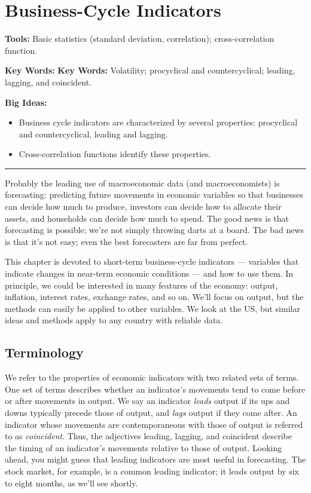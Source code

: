 \chapter{Business-Cycle Indicators}
\label{chp:bcin}
\hypertarget{indicators}{}

\textbf{Tools:} Basic statistics (standard deviation, correlation); cross-correlation function.

\textbf{Key Words:} \textbf{Key Words:} Volatility; procyclical and countercyclical;  leading, lagging, and coincident. 

\textbf{Big Ideas:}
\vspace{-0.1in}
\begin{itemize}
\item Business cycle indicators are characterized by several properties:  procyclical and countercyclical,
leading and lagging.
\item Cross-correlation functions identify these properties.
\end{itemize}
\rule{\textwidth}{1pt}

Probably the leading use of macroeconomic data (and macroeconomists)
is forecasting:  predicting future movements in economic variables
so that businesses can decide how much to produce,
investors can decide how to allocate their assets,
and households can decide how much to spend.
The good news is that forecasting is possible;
we're not simply throwing darts at a board.
The bad news is that it's not easy;
even the best forecasters are far from perfect.

This chapter is devoted to short-term business-cycle
indicators --- variables that indicate changes in near-term economic conditions --- and how to use them.
In principle, we could be interested in many features of
the economy:  output, inflation, interest rates,
exchange rates, and so on.
We'll focus on output, but the methods can easily be applied
to other variables.
We look at the US, but similar ideas and methods apply to
any country with reliable data.


\section{Terminology}

We refer to the properties of economic indicators with two related sets of terms.
One set of terms
describes whether an indicator's movements
tend to come before or after movements in output.
We say an indicator {\it leads\/} output if
its ups and downs typically precede those of output,
and {\it lags\/} output if they come after.
An indicator whose movements are contemporaneous with those of output
is referred to as {\it coincident\/}.
Thus, the adjectives leading, lagging, and  coincident
describe the timing of an indicator's movements relative to those of output.
Looking ahead, you might guess that leading indicators are
most useful in forecasting.
The stock market, for example, is a common leading indicator;
it leads output by six to eight months, as we'll see shortly.


